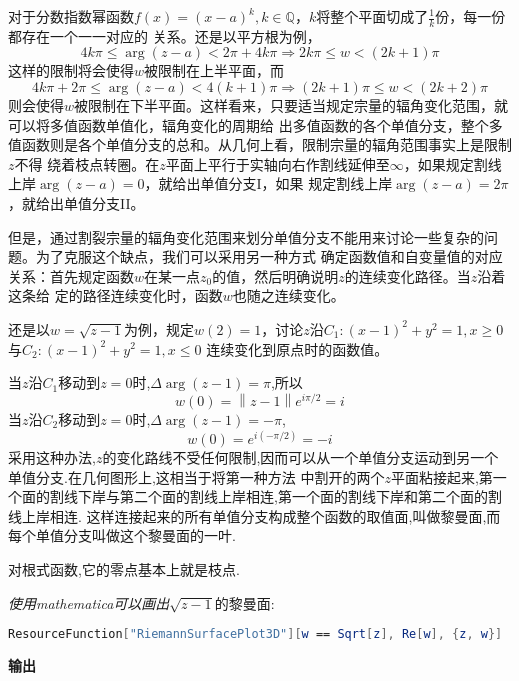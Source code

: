 \documentclass[UTF8]{ctexart}
\begin{document}
对于分数指数幂函数$f(x)=(x-a)^{k},k\in \mathbb{Q}$，$k$将整个平面切成了$\frac{1}{k}$份，每一份都存在一个一一对应的
关系。还是以平方根为例，
\begin{equation}
  4k\pi\leqslant \arg(z-a)<2\pi+4k\pi\Rightarrow 2k\pi\leqslant w<(2k+1)\pi
\end{equation}
这样的限制将会使得$w$被限制在上半平面，而
\begin{equation}
  4k\pi+2\pi\leqslant \arg(z-a)<4(k+1)\pi\Rightarrow (2k+1)\pi\leqslant w<(2k+2)\pi
\end{equation}
则会使得$w$被限制在下半平面。这样看来，只要适当规定宗量的辐角变化范围，就可以将多值函数单值化，辐角变化的周期给
出多值函数的各个单值分支，整个多值函数则是各个单值分支的总和。从几何上看，限制宗量的辐角范围事实上是限制$z$不得
绕着枝点转圈。在$z$平面上平行于实轴向右作割线延伸至$\infty$，如果规定割线上岸$\arg(z-a)=0$，就给出单值分支I，如果
规定割线上岸$\arg(z-a)=2\pi$，就给出单值分支II。

但是，通过割裂宗量的辐角变化范围来划分单值分支不能用来讨论一些复杂的问题。为了克服这个缺点，我们可以采用另一种方式
确定函数值和自变量值的对应关系：首先规定函数$w$在某一点$z_{0}$的值，然后明确说明$z$的连续变化路径。当$z$沿着这条给
定的路径连续变化时，函数$w$也随之连续变化。

还是以$w=\sqrt{z-1}$为例，规定$w(2)=1$，讨论$z$沿$C_{1}:(x-1)^2+y^2=1,x\geqslant0$与$C_{2}:(x-1)^2+y^2=1,x\leqslant0$
连续变化到原点时的函数值。

当$z$沿$C_{1}$移动到$z=0$时,$\Delta\arg(z-1)=\pi$,所以
\begin{equation}
  w(0)=\left\| z-1 \right\|e^{i\pi/2}=i
\end{equation}
当$z$沿$C_{2}$移动到$z=0$时,$\Delta\arg(z-1)=-\pi$,
\begin{equation}
  w(0)=e^{i(-\pi/2)}=-i
\end{equation}
采用这种办法,$z$的变化路线不受任何限制,因而可以从一个单值分支运动到另一个单值分支.在几何图形上,这相当于将第一种方法
中割开的两个$z$平面粘接起来,第一个面的割线下岸与第二个面的割线上岸相连,第一个面的割线下岸和第二个面的割线上岸相连.
这样连接起来的所有单值分支构成整个函数的取值面,叫做黎曼面,而每个单值分支叫做这个黎曼面的一叶.

对根式函数,它的零点基本上就是枝点.

\textit{使用mathematica可以画出}$\sqrt{z-1}$的黎曼面:
\begin{lstlisting}[language=Mathematica,style=mathematica]
  ResourceFunction["RiemannSurfacePlot3D"][w == Sqrt[z], Re[w], {z, w}]
\end{lstlisting}
\textbf{输出}
\end{document}
